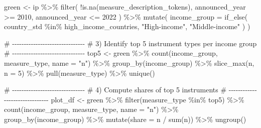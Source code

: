 \documentclass[
  letterpaper,
  DIV=11,
  numbers=noendperiod]{scrartcl}
\newenvironment{Shaded}{\begin{snugshade}}{\end{snugshade}}
\newcommand{\AttributeTok}[1]{\textcolor[rgb]{0.40,0.45,0.13}{#1}}
\newcommand{\CommentTok}[1]{\textcolor[rgb]{0.37,0.37,0.37}{#1}}
\newcommand{\DecValTok}[1]{\textcolor[rgb]{0.68,0.00,0.00}{#1}}
\newcommand{\FunctionTok}[1]{\textcolor[rgb]{0.28,0.35,0.67}{#1}}
\newcommand{\NormalTok}[1]{\textcolor[rgb]{0.00,0.23,0.31}{#1}}
\newcommand{\OtherTok}[1]{\textcolor[rgb]{0.00,0.23,0.31}{#1}}
\newcommand{\SpecialCharTok}[1]{\textcolor[rgb]{0.37,0.37,0.37}{#1}}
\newcommand{\StringTok}[1]{\textcolor[rgb]{0.13,0.47,0.30}{#1}}
\begin{document}
\begin{Shaded}
\begin{Highlighting}[]
\NormalTok{green }\OtherTok{\textless{}{-}}\NormalTok{ ip }\SpecialCharTok{\%\textgreater{}\%}
  \FunctionTok{filter}\NormalTok{(}
    \SpecialCharTok{!}\FunctionTok{is.na}\NormalTok{(measure\_description\_tokens),}
\NormalTok{    announced\_year }\SpecialCharTok{\textgreater{}=} \DecValTok{2010}\NormalTok{,}
\NormalTok{    announced\_year }\SpecialCharTok{\textless{}=} \DecValTok{2022}
\NormalTok{  ) }\SpecialCharTok{\%\textgreater{}\%}
  \FunctionTok{mutate}\NormalTok{(}
    \AttributeTok{income\_group =} \FunctionTok{if\_else}\NormalTok{(}
\NormalTok{      country\_std }\SpecialCharTok{\%in\%}\NormalTok{ high\_income\_countries,}
      \StringTok{"High{-}income"}\NormalTok{,}
      \StringTok{"Middle{-}income"}
\NormalTok{    )}
\NormalTok{  )}

\CommentTok{\# {-}{-}{-}{-}{-}{-}{-}{-}{-}{-}{-}{-}{-}{-}{-}{-}{-}{-}{-}{-}{-}{-}{-}{-}{-}{-}{-}{-}{-}{-}{-}}
\CommentTok{\# 3) Identify top 5 instrument types per income group}
\CommentTok{\# {-}{-}{-}{-}{-}{-}{-}{-}{-}{-}{-}{-}{-}{-}{-}{-}{-}{-}{-}{-}{-}{-}{-}{-}{-}{-}{-}{-}{-}{-}{-}}
\NormalTok{top5 }\OtherTok{\textless{}{-}}\NormalTok{ green }\SpecialCharTok{\%\textgreater{}\%}
  \FunctionTok{count}\NormalTok{(income\_group, measure\_type, }\AttributeTok{name =} \StringTok{"n"}\NormalTok{) }\SpecialCharTok{\%\textgreater{}\%}
  \FunctionTok{group\_by}\NormalTok{(income\_group) }\SpecialCharTok{\%\textgreater{}\%}
  \FunctionTok{slice\_max}\NormalTok{(n, }\AttributeTok{n =} \DecValTok{5}\NormalTok{) }\SpecialCharTok{\%\textgreater{}\%}
  \FunctionTok{pull}\NormalTok{(measure\_type) }\SpecialCharTok{\%\textgreater{}\%}
  \FunctionTok{unique}\NormalTok{()}

\CommentTok{\# {-}{-}{-}{-}{-}{-}{-}{-}{-}{-}{-}{-}{-}{-}{-}{-}{-}{-}{-}{-}{-}{-}{-}{-}{-}{-}{-}{-}{-}{-}{-}}
\CommentTok{\#  4) Compute shares of top 5 instruments}
\CommentTok{\# {-}{-}{-}{-}{-}{-}{-}{-}{-}{-}{-}{-}{-}{-}{-}{-}{-}{-}{-}{-}{-}{-}{-}{-}{-}{-}{-}{-}{-}{-}{-}}
\NormalTok{plot\_df }\OtherTok{\textless{}{-}}\NormalTok{ green }\SpecialCharTok{\%\textgreater{}\%}
  \FunctionTok{filter}\NormalTok{(measure\_type }\SpecialCharTok{\%in\%}\NormalTok{ top5) }\SpecialCharTok{\%\textgreater{}\%}
  \FunctionTok{count}\NormalTok{(income\_group, measure\_type, }\AttributeTok{name =} \StringTok{"n"}\NormalTok{) }\SpecialCharTok{\%\textgreater{}\%}
  \FunctionTok{group\_by}\NormalTok{(income\_group) }\SpecialCharTok{\%\textgreater{}\%}
  \FunctionTok{mutate}\NormalTok{(}\AttributeTok{share =}\NormalTok{ n }\SpecialCharTok{/} \FunctionTok{sum}\NormalTok{(n)) }\SpecialCharTok{\%\textgreater{}\%}
  \FunctionTok{ungroup}\NormalTok{()}


\end{Highlighting}
\end{Shaded}
\end{document}
